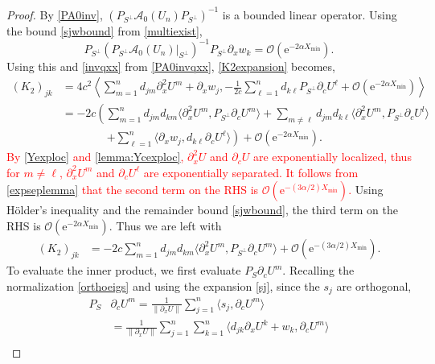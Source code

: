 \documentclass[review,onefignum,onetabnum]{siamart171218}
\newcommand{\rme}{\mathrm{e}}
\newcommand{\calA}{\mathcal{A}}
\newcommand{\vK}{\bm{\mathit{K}}}
\newcommand{\revised}[1]{ \textcolor{red}{#1} }
\begin{document}
\begin{proof}
By \cref{PA0inv}, $(P_{S^\perp} \calA_0(U_n)P_{S^\perp})^{-1}$ is a bounded linear operator. Using the bound \cref{sjwbound} from \cref{multiexist},
\[
P_{S^\perp} (P_{S^\perp} \calA_0(U_n)|_{S^\perp})^{-1} P_{S^\perp}\partial_xw_k = \mathcal{O}(\rme^{-2 \alpha X_{\mathrm{min}}}).
\]
Using this and \cref{invqxx} from \cref{PA0invqxx}, \cref{K2expansion} becomes,
\[
\begin{aligned}
(\vK_2)_{jk}
&= 4 c^2 \left\langle \sum_{m = 1}^{n} d_{jm}\partial_x^2U^m + \partial_xw_j,
-\frac{1}{2c}\sum_{\ell = 1}^{n} d_{k\ell} P_{S^\perp}\partial_cU^\ell + \mathcal{O}(\rme^{-2 \alpha X_{\mathrm{min}}}) \right\rangle \\
&= -2 c \left( \sum_{m = 1}^{n} d_{jm} d_{km} \langle \partial_x^2U^m, P_{S^\perp} \partial_cU^m \rangle
+ \sum_{m\neq \ell} d_{jm} d_{k\ell} \langle \partial_x^2U^m, P_{S^\perp} \partial_cU^l \rangle\right.\\
&\qquad\qquad\left.+ \sum_{\ell=1}^n \langle \partial_xw_j, d_{k\ell}\partial_cU^\ell \rangle \right)
 + \mathcal{O}(\rme^{-2 \alpha X_{\mathrm{min}}}).
\end{aligned}
\]
\revised{
By \cref{Yexploc} and \cref{lemma:Ycexploc}, $\partial_x^2 U$ and $\partial_c U$ are exponentially localized, thus for $m\neq\ell$, $\partial_x^2U^m$ and $\partial_cU^\ell$ are exponentially separated. It follows from \cref{expseplemma} that the second term on the RHS is $\mathcal{O}(\rme^{-(3 \alpha/2) X_{\mathrm{min}}})$.
}
Using H\"{o}lder's inequality and the remainder bound \cref{sjwbound}, the third term on the RHS is $\mathcal{O}(\rme^{-2 \alpha X_{\mathrm{min}}})$. Thus we are left with
\begin{equation}\label{K2step1}
\begin{aligned}
(\vK_2)_{jk}
&= -2 c \sum_{m = 1}^{n} d_{jm} d_{km} \langle \partial_x^2U^m, P_{S^\perp} \partial_cU^m \rangle + \mathcal{O}(\rme^{-(3 \alpha/2) X_{\mathrm{min}}}).
\end{aligned}
\end{equation}
To evaluate the inner product, we first evaluate $P_S \partial_c U^m$. Recalling the normalization \cref{orthoeigs} and using the expansion \cref{sj}, since the $s_j$ are orthogonal,
\[
\begin{aligned}
P_S &\partial_c U^m = \frac{1}{\|\partial_x U\|} \sum_{j=1}^n \langle s_j, \partial_c U^m \rangle \\
&= \frac{1}{\|\partial_x U\|} \sum_{j=1}^n \sum_{k=1}^n \langle d_{jk} \partial_x U^k + w_k, \partial_c U^m \rangle \\

\end{aligned}\]
\end{proof}
\end{document}
